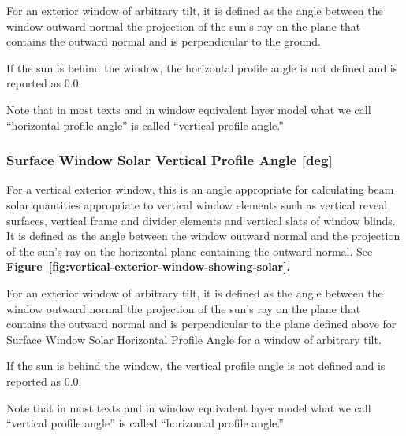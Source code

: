 For an exterior window of arbitrary tilt, it is defined as the angle between the window outward normal the projection of the sun's ray on the plane that contains the outward normal and is perpendicular to the ground.

If the sun is behind the window, the horizontal profile angle is not defined and is reported as 0.0.

Note that in most texts and in window equivalent layer model what we call ``horizontal profile angle'' is called ``vertical profile angle.''

\subsubsection{Surface Window Solar Vertical Profile Angle {[}deg{]}}\label{surface-window-solar-vertical-profile-angle-deg}

For a vertical exterior window, this is an angle appropriate for calculating beam solar quantities appropriate to vertical window elements such as vertical reveal surfaces, vertical frame and divider elements and vertical slats of window blinds. It is defined as the angle between the window outward normal and the projection of the sun's ray on the horizontal plane containing the outward normal. See \textbf{Figure~\ref{fig:vertical-exterior-window-showing-solar}.}

For an exterior window of arbitrary tilt, it is defined as the angle between the window outward normal the projection of the sun's ray on the plane that contains the outward normal and is perpendicular to the plane defined above for Surface Window Solar Horizontal Profile Angle for a window of arbitrary tilt.

If the sun is behind the window, the vertical profile angle is not defined and is reported as 0.0.

Note that in most texts and in window equivalent layer model what we call ``vertical profile angle'' is called ``horizontal profile angle.''

